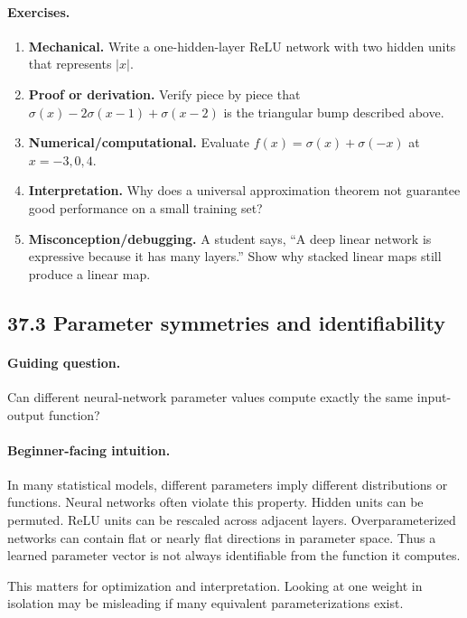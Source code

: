 \paragraph{Exercises.}
\begin{enumerate}[label=\textbf{37.2.\arabic*.}, leftmargin=*]
\item \textbf{Mechanical.} Write a one-hidden-layer ReLU network with two hidden units that represents \(|x|\).
\item \textbf{Proof or derivation.} Verify piece by piece that \(\sigma(x)-2\sigma(x-1)+\sigma(x-2)\) is the triangular bump described above.
\item \textbf{Numerical/computational.} Evaluate \(f(x)=\sigma(x)+\sigma(-x)\) at \(x=-3,0,4\).
\item \textbf{Interpretation.} Why does a universal approximation theorem not guarantee good performance on a small training set?
\item \textbf{Misconception/debugging.} A student says, ``A deep linear network is expressive because it has many layers.'' Show why stacked linear maps still produce a linear map.
\end{enumerate}

\subsection{37.3 Parameter symmetries and identifiability}

\paragraph{Guiding question.}
Can different neural-network parameter values compute exactly the same input-output function?

\paragraph{Beginner-facing intuition.}
In many statistical models, different parameters imply different distributions or functions. Neural networks often violate this property. Hidden units can be permuted. ReLU units can be rescaled across adjacent layers. Overparameterized networks can contain flat or nearly flat directions in parameter space. Thus a learned parameter vector is not always identifiable from the function it computes.

This matters for optimization and interpretation. Looking at one weight in isolation may be misleading if many equivalent parameterizations exist.

